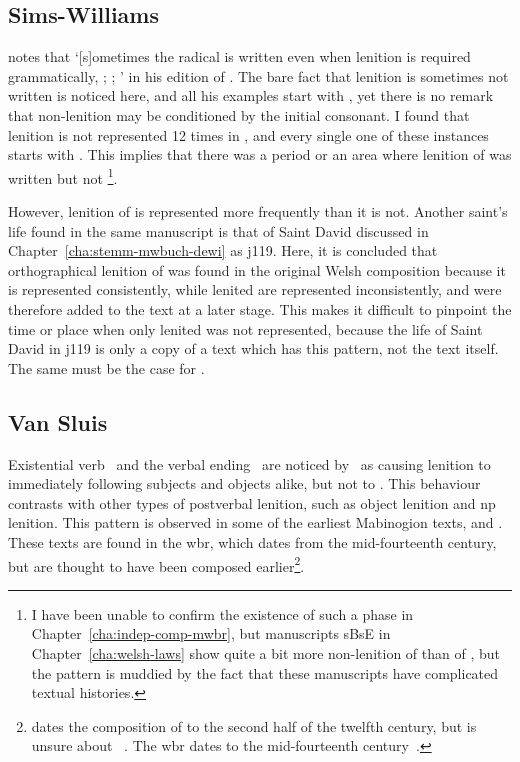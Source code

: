 \subsection{Sims-Williams}
\label{sec:sims-williams}

\Textcite[107n]{Sim_Buchedd18} notes that `[s]ometimes the radical is written even when lenition is required grammatically, \eg {}; ; ' in his edition of . The bare fact that lenition is sometimes not written is noticed here, and all his examples start with , yet there is no remark that non-lenition may be conditioned by the initial consonant. I found that lenition is not represented 12 times in , and every single one of these instances starts with . This implies that there was a period or an area where lenition of  was written but not \footnote{I have been unable to confirm the existence of such a phase in Chapter~\ref{cha:indep-comp-mwbr}, but manuscripts \gls{sB}\gls{sE} in Chapter~\ref{cha:welsh-laws} show quite a bit more non-lenition of  than of , but the pattern is muddied by the fact that these manuscripts have complicated textual histories.}.

However, lenition of  is represented more frequently than it is not. Another saint's life found in the same manuscript  is that of Saint David discussed in Chapter~\ref{cha:stemm-mwbuch-dewi} as \gls{j119}. Here, it is concluded that orthographical lenition of  was found in the original Welsh composition because it is represented consistently, while lenited  are represented inconsistently, and were therefore added to the text at a later stage. This makes it difficult to pinpoint the time or place when only lenited  was not represented, because the life of Saint David in \gls{j119} is only a copy of a text which has this pattern, not the text itself. The same must be the case for .

\subsection{Van Sluis}
\label{sec:van-sluis}
Existential verb \oes\ and the verbal ending \ei\ are noticed by~\textcite{van_development14} as causing lenition to immediately following subjects and objects alike, but not to . This behaviour contrasts with other types of postverbal lenition, such as object lenition and \gls{np} lenition. This pattern is observed in some of the earliest Mabinogion texts, \ie {} and . These texts are found in the \gls{wbr}, which dates from the mid-fourteenth century, but are thought to have been composed earlier\footnote{\Textcite[43]{rodway_date_2005} dates the composition of  to the second half of the twelfth century, but is unsure about ~\autocite[59]{Rod_Where07}. The \gls{wbr} dates to the mid-fourteenth century~\autocite[59]{huws_medieval_2000}.}.

